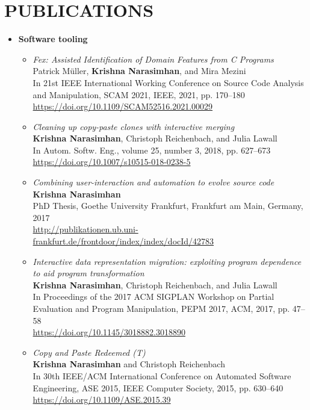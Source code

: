 \section{PUBLICATIONS}


    \begin{itemize}
        \item \textbf{Software tooling}
        \begin{itemize}

\item \emph{Fex: Assisted Identification of Domain Features from C Programs} \\
Patrick Müller, \textbf{Krishna Narasimhan}, and Mira Mezini \\
In 21st IEEE International Working Conference on Source Code Analysis and Manipulation, SCAM 2021, IEEE, 2021, pp. 170--180 \\
\url{https://doi.org/10.1109/SCAM52516.2021.00029}

\item \emph{Cleaning up copy-paste clones with interactive merging} \\
\textbf{Krishna Narasimhan}, Christoph Reichenbach, and Julia Lawall \\
In Autom. Softw. Eng., volume 25, number 3, 2018, pp. 627--673 \\
\url{https://doi.org/10.1007/s10515-018-0238-5}

\item \emph{Combining user-interaction and automation to evolve source code} \\
\textbf{Krishna Narasimhan} \\
PhD Thesis, Goethe University Frankfurt, Frankfurt am Main, Germany, 2017 \\
\url{http://publikationen.ub.uni-frankfurt.de/frontdoor/index/index/docId/42783}

\item \emph{Interactive data representation migration: exploiting program dependence to aid program transformation} \\
\textbf{Krishna Narasimhan}, Christoph Reichenbach, and Julia Lawall \\
In Proceedings of the 2017 ACM SIGPLAN Workshop on Partial Evaluation and Program Manipulation, PEPM 2017, ACM, 2017, pp. 47--58 \\
\url{https://doi.org/10.1145/3018882.3018890}


\item \emph{Copy and Paste Redeemed (T)} \\
\textbf{Krishna Narasimhan} and Christoph Reichenbach \\
In 30th IEEE/ACM International Conference on Automated Software Engineering, ASE 2015, IEEE Computer Society, 2015, pp. 630--640 \\
\url{https://doi.org/10.1109/ASE.2015.39}


\end{itemize}
\end{itemize}
